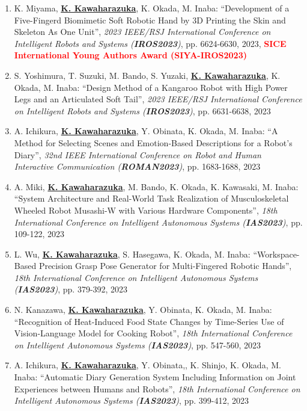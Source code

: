 \documentclass[letterpaper]{article}
\begin{document}
\begin{enumerate}
\item K. Miyama, \underline{\textbf{K. Kawaharazuka}}, K. Okada, M. Inaba: ``Development of a Five-Fingerd Biomimetic Soft Robotic Hand by 3D Printing the Skin and Skeleton As One Unit'', \textit{2023 IEEE/RSJ International Conference on Intelligent Robots and Systems (\textit{\textbf{IROS2023}})}, pp. 6624-6630, 2023, \textbf{\textcolor{red}{SICE International Young Authors Award (SIYA-IROS2023)}}
\item S. Yoshimura, T. Suzuki, M. Bando, S. Yuzaki, \underline{\textbf{K. Kawaharazuka}}, K. Okada, M. Inaba: ``Design Method of a Kangaroo Robot with High Power Legs and an Articulated Soft Tail'', \textit{2023 IEEE/RSJ International Conference on Intelligent Robots and Systems (\textit{\textbf{IROS2023}})}, pp. 6631-6638, 2023
\item A. Ichikura, \underline{\textbf{K. Kawaharazuka}}, Y. Obinata, K. Okada, M. Inaba: ``A Method for Selecting Scenes and Emotion-Based Descriptions for a Robot's Diary'', \textit{32nd IEEE International Conference on Robot and Human Interactive Communication (\textit{\textbf{ROMAN2023}})}, pp. 1683-1688, 2023
\item A. Miki, \underline{\textbf{K. Kawaharazuka}}, M. Bando, K. Okada, K. Kawasaki, M. Inaba: ``System Architecture and Real-World Task Realization of Musculoskeletal Wheeled Robot Musashi-W with Various Hardware Components'', \textit{18th International Conference on Intelligent Autonomous Systems (\textit{\textbf{IAS2023}})}, pp. 109-122, 2023
\item L. Wu, \underline{\textbf{K. Kawaharazuka}}, S. Hasegawa, K. Okada, M. Inaba: ``Workspace-Based Precision Grasp Pose Generator for Multi-Fingered Robotic Hands'', \textit{18th International Conference on Intelligent Autonomous Systems (\textit{\textbf{IAS2023}})}, pp. 379-392, 2023
\item N. Kanazawa, \underline{\textbf{K. Kawaharazuka}}, Y. Obinata, K. Okada, M. Inaba: ``Recognition of Heat-Induced Food State Changes by Time-Series Use of Vision-Language Model for Cooking Robot'', \textit{18th International Conference on Intelligent Autonomous Systems (\textit{\textbf{IAS2023}})}, pp. 547-560, 2023
\item A. Ichikura, \underline{\textbf{K. Kawaharazuka}}, Y. Obinata,, K. Shinjo, K. Okada, M. Inaba: ``Automatic Diary Generation System Including Information on Joint Experiences between Humans and Robots'', \textit{18th International Conference on Intelligent Autonomous Systems (\textit{\textbf{IAS2023}})}, pp. 399-412, 2023

\end{enumerate}
\end{document}
